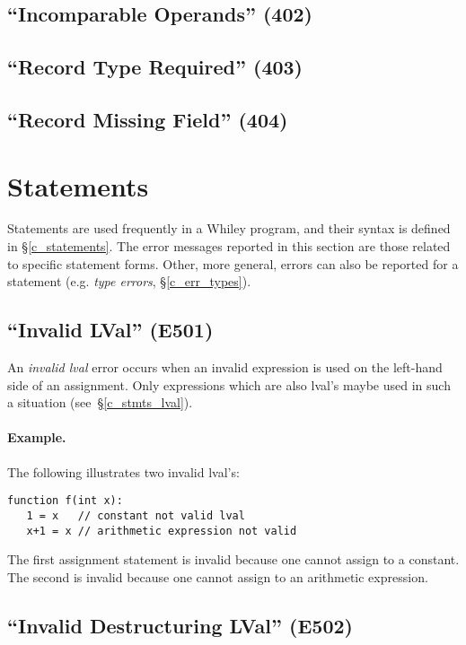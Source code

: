 \subsection{``Incomparable Operands'' (402)}

\subsection{``Record Type Required'' (403)}

\subsection{``Record Missing Field'' (404)}


\section{Statements}

Statements are used frequently in a Whiley program, and their syntax is defined in \S\ref{c_statements}.  The error messages reported in this section are those related to specific statement forms.  Other, more general, errors can also be reported for a statement (e.g. {\em type errors}, \S\ref{c_err_types}).

\subsection{``Invalid LVal'' (E501)}

An {\em invalid lval} error occurs when an invalid expression is used on the left-hand side of an assignment.  Only expressions which are also lval's maybe used in such a situation  (see~\S\ref{c_stmts_lval}).

\paragraph{Example.}  The following illustrates two invalid lval's:

\begin{lstlisting}
function f(int x):
   1 = x   // constant not valid lval
   x+1 = x // arithmetic expression not valid    
\end{lstlisting}

The first assignment statement is invalid because one cannot assign to a constant.  The second is invalid because one cannot assign to an arithmetic expression.

\subsection{``Invalid Destructuring LVal'' (E502)}

